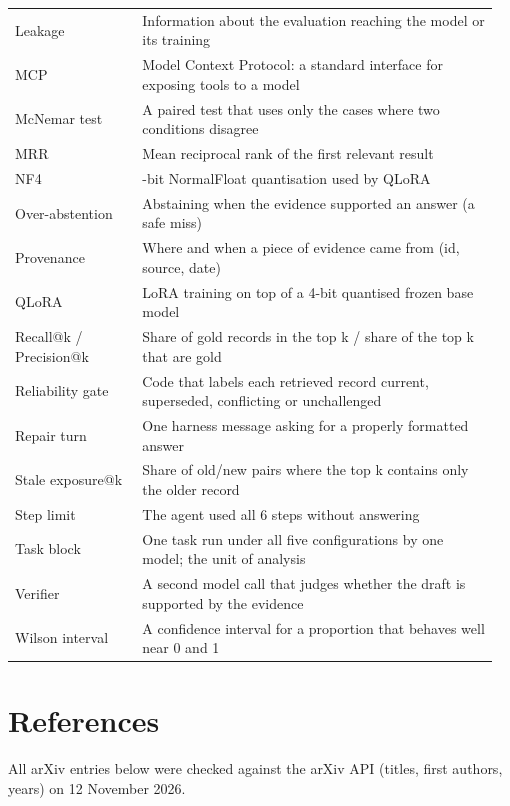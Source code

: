 \documentclass[10.5pt,a4paper,oneside]{report}
\begin{document}
\begin{longtable}{>{\raggedright\arraybackslash}p{0.255\linewidth}>{\raggedright\arraybackslash}p{0.705\linewidth}}
Leakage & Information about the evaluation reaching the model or its training \\
MCP & Model Context Protocol: a standard interface for exposing tools to a model \\
McNemar test & A paired test that uses only the cases where two conditions disagree \\
MRR & Mean reciprocal rank of the first relevant result \\
NF4 & 4-bit NormalFloat quantisation used by QLoRA \\
Over-abstention & Abstaining when the evidence supported an answer (a safe miss) \\
Provenance & Where and when a piece of evidence came from (id, source, date) \\
QLoRA & LoRA training on top of a 4-bit quantised frozen base model \\
Recall@k / Precision@k & Share of gold records in the top k / share of the top k that are gold \\
Reliability gate & Code that labels each retrieved record current, superseded, conflicting or unchallenged \\
Repair turn & One harness message asking for a properly formatted answer \\
Stale exposure@k & Share of old/new pairs where the top k contains only the older record \\
Step limit & The agent used all 6 steps without answering \\
Task block & One task run under all five configurations by one model; the unit of analysis \\
Verifier & A second model call that judges whether the draft is supported by the evidence \\
Wilson interval & A confidence interval for a proportion that behaves well near 0 and 1 \\
\end{longtable}
\endgroup

\chapter*{References}
All arXiv entries below were checked against the arXiv API (titles, first authors, years) on 12 November 2026.
\end{document}
